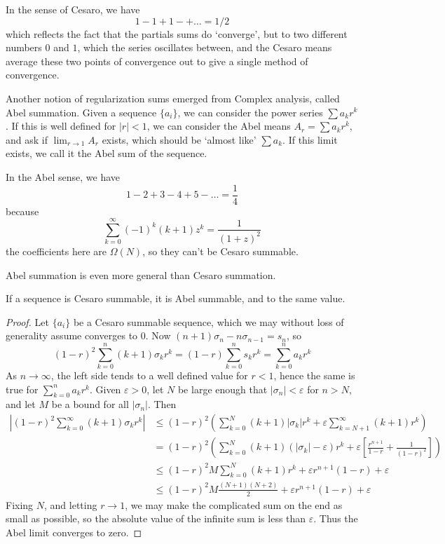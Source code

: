 \begin{example}
In the sense of Cesaro, we have
%
\[ 1 - 1 + 1 - + \dots = 1/2 \]
%
which reflects the fact that the partials sums do `converge', but to two different numbers $0$ and $1$, which the series oscillates between, and the Cesaro means average these two points of convergence out to give a single method of convergence.
\end{example}

Another notion of regularization sums emerged from Complex analysis, called Abel summation. Given a sequence $\{ a_i \}$, we can consider the power series $\sum a_k r^k$. If this is well defined for $|r| < 1$, we can consider the Abel means $A_r = \sum a_k r^k$, and ask if $\lim_{r \to 1} A_r$ exists, which should be `almost like' $\sum a_k$. If this limit exists, we call it the Abel sum of the sequence.

\begin{example}
    In the Abel sense, we have
    \[ 1 - 2 + 3 - 4 + 5 - \dots = \frac{1}{4} \]
    because
    \[ \sum_{k = 0}^\infty (-1)^k (k + 1) z^k = \frac{1}{(1 + z)^2} \]
    the coefficients here are $\Omega(N)$, so they can't be Cesaro summable.
\end{example}

Abel summation is even more general than Cesaro summation.

\begin{theorem}
    If a sequence is Cesaro summable, it is Abel summable, and to the same value.
\end{theorem}
\begin{proof}
    Let $\{ a_i \}$ be a Cesaro summable sequence, which we may without loss of generality assume converges to $0$. Now $(n + 1)\sigma_n - n \sigma_{n-1} = s_n$, so
    \[ (1 - r)^2 \sum_{k = 0}^n (k + 1) \sigma_k r^k = (1 - r) \sum_{k = 0}^n s_k r^k = \sum_{k = 0}^n a_k r^k \]
    As $n \to \infty$, the left side tends to a well defined value for $r < 1$, hence the same is true for $\sum_{k = 0}^n a_k r^k$. Given $\varepsilon > 0$, let $N$ be large enough that $|\sigma_n| < \varepsilon$ for $n > N$, and let $M$ be a bound for all $|\sigma_n|$. Then
    \begin{align*}
        \left| (1 - r)^2 \sum_{k = 0}^\infty (k + 1) \sigma_k r^k \right| &\leq (1 - r)^2 \left( \sum_{k = 0}^N (k + 1) |\sigma_k| r^k + \varepsilon \sum_{k = N+1}^\infty (k + 1) r^k \right)\\
        &= (1 - r)^2 \left( \sum_{k = 0}^N (k + 1) (|\sigma_k| - \varepsilon) r^k + \varepsilon \left[ \frac{r^{n+1}}{1-r} + \frac{1}{(1 - r)^2} \right] \right)\\
        &\leq (1 - r)^2 M \sum_{k = 0}^N (k + 1) r^k + \varepsilon r^{n+1} (1 - r) + \varepsilon\\
        &\leq (1 - r)^2 M \frac{(N+1)(N+2)}{2} + \varepsilon r^{n+1} (1 - r) + \varepsilon
    \end{align*}
    Fixing $N$, and letting $r \to 1$, we may make the complicated sum on the end as small as possible, so the absolute value of the infinite sum is less than $\varepsilon$. Thus the Abel limit converges to zero.
\end{proof}

